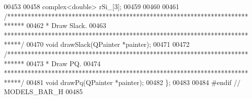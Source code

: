 \begin{DoxyCode}
00453 
00458   complex<\textcolor{keywordtype}{double}> rSi\_[3];
00459 
00460 
00461   \textcolor{comment}{/*****************************************************************************}
00462 \textcolor{comment}{  * Draw Slack.}
00463 \textcolor{comment}{  *****************************************************************************/}
00470   \textcolor{keywordtype}{void} drawSlack(QPainter *painter);
00471 
00472   \textcolor{comment}{/*****************************************************************************}
00473 \textcolor{comment}{  * Draw PQ.}
00474 \textcolor{comment}{  *****************************************************************************/}
00481   \textcolor{keywordtype}{void} drawPq(QPainter *painter);
00482 \};
00483 
00484 \textcolor{preprocessor}{#endif  // MODELS\_BAR\_H}
00485 
\end{DoxyCode}
